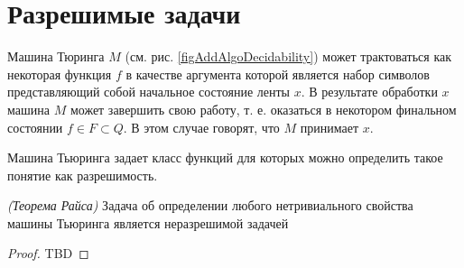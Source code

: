\section{Разрешимые задачи}

Машина Тюринга $M$ (см. рис. \ref{figAddAlgoDecidability}) может
трактоваться как некоторая функция $f$ в качестве 
аргумента которой является набор символов представляющий собой
начальное состояние ленты $x$. В результате обработки $x$ машина $M$
может завершить свою работу, т. е. оказаться в некотором финальном
состоянии $f \in F \subset Q$. В этом случае говорят, что $M$
принимает $x$. 

Машина Тьюринга задает класс функций для которых можно определить
такое понятие как разрешимость.



\begin{theorem}
\emph{(Теорема Райса)}
Задача об определении любого нетривиального свойства машины Тьюринга
является неразрешимой задачей
\end{theorem}

\begin{proof}
TBD
\end{proof}

